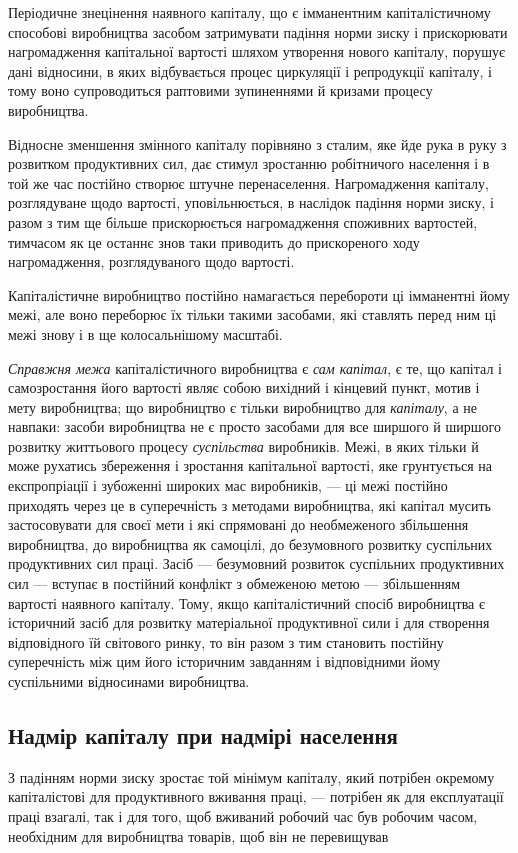 Періодичне знецінення наявного капіталу, що є імманентним
капіталістичному способові виробництва засобом затримувати
падіння норми зиску і прискорювати нагромадження капітальної
вартості шляхом утворення нового капіталу, порушує дані відносини,
в яких відбувається процес циркуляції і репродукції
капіталу, і тому воно супроводиться раптовими зупиненнями й
кризами процесу виробництва.

Відносне зменшення змінного капіталу порівняно з сталим,
яке йде рука в руку з розвитком продуктивних сил, дає стимул
зростанню робітничого населення і в той же час постійно створює
штучне перенаселення. Нагромадження капіталу, розглядуване
щодо вартості, уповільнюється, в наслідок падіння норми зиску, і
разом з тим ще більше прискорюється нагромадження споживних
вартостей, тимчасом як це останнє знов таки приводить до прискореного
ходу нагромадження, розглядуваного щодо вартості.

Капіталістичне виробництво постійно намагається перебороти
ці імманентні йому межі, але воно переборює їх тільки такими
засобами, які ставлять перед ним ці межі знову і в ще колосальнішому
масштабі.

\emph{Справжня межа} капіталістичного виробництва є \emph{сам капітал},
є те, що капітал і самозростання його вартості являє собою
вихідний і кінцевий пункт, мотив і мету виробництва; що виробництво
є тільки виробництво для \emph{капіталу}, а не навпаки:
засоби виробництва не є просто засобами для все ширшого й
ширшого розвитку життьового процесу \emph{суспільства} виробників.
Межі, в яких тільки й може рухатись збереження і зростання
капітальної вартості, яке грунтується на експропріації і зубоженні
широких мас виробників, — ці межі постійно приходять
через це в суперечність з методами виробництва, які капітал
мусить застосовувати для своєї мети і які спрямовані до необмеженого
збільшення виробництва, до виробництва як самоцілі, до безумовного
розвитку суспільних продуктивних сил праці. Засіб —
безумовний розвиток суспільних продуктивних сил — вступає
в постійний конфлікт з обмеженою метою — збільшенням вартості
наявного капіталу. Тому, якщо капіталістичний спосіб виробництва
є історичний засіб для розвитку матеріальної продуктивної
сили і для створення відповідного їй світового ринку, то
він разом з тим становить постійну суперечність між цим його
історичним завданням і відповідними йому суспільними відносинами
виробництва.

\subsection{Надмір капіталу при надмірі населення}

З падінням норми зиску зростає той мінімум капіталу, який
потрібен окремому капіталістові для продуктивного вживання
праці, — потрібен як для експлуатації праці взагалі, так і для
того, щоб вживаний робочий час був робочим часом, необхідним
для виробництва товарів, щоб він не перевищував
\parbreak{}  %
